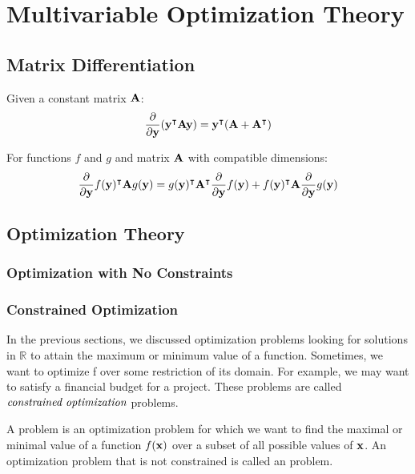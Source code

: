 

\chapter{Multivariable Optimization Theory}

\section{Matrix Differentiation}

\begin{theorem}
    Given a constant matrix $\MA$:
    $$\frac{\partial}{\partial\vy}(\vy^\intercal\MA\vy) = \vy^\intercal(\MA + \MA^\intercal)$$
\end{theorem}
\begin{theorem}
    For functions $f$ and $g$ and matrix $\MA$ with compatible dimensions:
    $$\frac{\partial}{\partial\vy}f(\vy)^\intercal\MA g(\vy) = g(\vy)^\intercal\MA^\intercal\frac{\partial}{\partial\vy}f(\vy) + f(\vy)^\intercal\MA\frac{\partial}{\partial\vy}g(\vy)$$
\end{theorem}

\section{Optimization Theory} \label{optim}

\subsection{Optimization with No Constraints} 

\subsection{Constrained Optimization}

In the previous sections, we discussed optimization problems looking for solutions in $\mathbb{R}$ to attain the maximum or minimum value of a function. Sometimes, we want to optimize f over some restriction of its domain. For example, we may want to satisfy a financial budget for a project. These problems are called $\define{constrained optimization}$ problems.

\begin{definition}\label{def_constrained_optimization} 
A  problem is an optimization problem for which we want to find the maximal or minimal value of a function $f(\vx)$ over a subset of all possible values of $\vx$. An optimization problem that is not constrained is called an  problem.
\end{definition}

